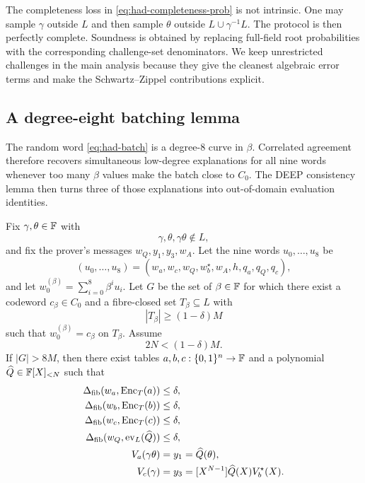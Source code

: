 \begin{remark}
\label{rem:had-perfect-completeness}
The completeness loss in \eqref{eq:had-completeness-prob} is not intrinsic.  One may sample $\gamma$ outside $L$ and then sample $\theta$ outside $L\cup\gamma^{-1}L$.  The protocol is then perfectly complete.  Soundness is obtained by replacing full-field root probabilities with the corresponding challenge-set denominators.  We keep unrestricted challenges in the main analysis because they give the cleanest algebraic error terms and make the Schwartz--Zippel contributions explicit.
\end{remark}

\subsection{A degree-eight batching lemma}
\label{sec:hadamard-batching}

The random word \eqref{eq:had-batch} is a degree-$8$ curve in $\beta$.  Correlated agreement therefore recovers simultaneous low-degree explanations for all nine words whenever too many $\beta$ values make the batch close to $C_0$.  The DEEP consistency lemma then turns three of those explanations into out-of-domain evaluation identities.

\begin{lemma}
\label{lem:had-batching}
Fix $\gamma,\theta\in\mathbb{F}$ with
\[
  \gamma,\theta,\gamma\theta\notin L,
\]
and fix the prover's messages $w_Q,y_1,y_3,w_A$.  Let the nine words $u_0,\ldots,u_8$ be
\[
  (u_0,\ldots,u_8)
  =
  (w_a,w_c,w_Q,w_b^{\star},w_A,h,q_a,q_Q,q_c),
\]
and let $w_0^{(\beta)}=\sum_{i=0}^8\beta^iu_i$.  Let $G$ be the set of $\beta\in\mathbb{F}$ for which there exist a codeword $c_\beta\in C_0$ and a fibre-closed set $T_\beta\subseteq L$ with
\[
  |T_\beta|\ge(1-\delta)M
\]
such that $w_0^{(\beta)}=c_\beta$ on $T_\beta$.  Assume
\begin{equation}
  2N<(1-\delta)M.
  \label{eq:had-degree-margin}
\end{equation}
If $|G|>8M$, then there exist tables $a,b,c:\{0,1\}^n\to\mathbb{F}$ and a polynomial $\widehat Q\in\mathbb{F}[X]_{<N}$ such that
\begin{align}
  \Delta_{\mathrm{fib}}(w_a,\operatorname{Enc}_T(a))&\le\delta,
  \label{eq:had-batch-decode-a}\\
  \Delta_{\mathrm{fib}}(w_b,\operatorname{Enc}_T(b))&\le\delta,
  \label{eq:had-batch-decode-b}\\
  \Delta_{\mathrm{fib}}(w_c,\operatorname{Enc}_T(c))&\le\delta,
  \label{eq:had-batch-decode-c}\\
  \Delta_{\mathrm{fib}}(w_Q,\operatorname{ev}_L(\widehat Q))&\le\delta,
  \label{eq:had-batch-decode-Q}\\
  V_a(\gamma\theta)&=y_1=\widehat Q(\theta),
  \label{eq:had-batch-link-Q}\\
  V_c(\gamma)&=y_3=[X^{N-1}]\widehat Q(X)V_b^{\star}(X).
  \label{eq:had-batch-coefficient}
\end{align}
\end{lemma}

